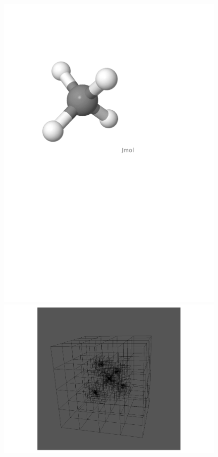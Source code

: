 \begin{frame}
\begin{columns}
    \begin{column}[b]{0.6\textwidth}
    \begin{figure}
        \includegraphics[scale=0.2, clip, viewport = 100 450 400 720]
        {figures/methane.pdf}
        \includegraphics[scale=0.3, clip, viewport = 320 200 520 400]
        {figures/methaneGrid.pdf}
    \end{figure}


\end{column}
\end{columns}
\end{frame}
